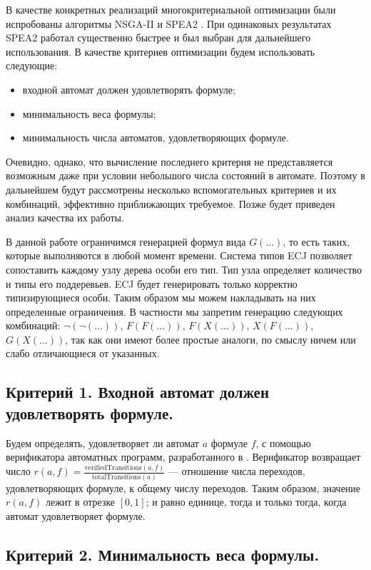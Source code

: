 \documentclass[12pt,fleqn]{article}
\begin{document}
В качестве конкретных реализаций многокритериальной оптимизации были испробованы алгоритмы NSGA-II \cite{nsga2} и SPEA2 \cite{spea2}.
При одинаковых результатах SPEA2 работал существенно быстрее и был выбран для дальнейшего использования.
В качестве критериев оптимизации будем использовать следующие:
\begin{itemize}
\item входной автомат должен удовлетворять формуле;
\item минимальность веса формулы;
\item минимальность числа автоматов, удовлетворяющих формуле.
\end{itemize}
Очевидно, однако, что вычисление последнего
критерия не представляется возможным даже при условии небольшого числа состояний в автомате. Поэтому в дальнейшем будут
рассмотрены несколько вспомогательных критериев и их комбинаций, эффективно приближающих требуемое. Позже будет приведен
анализ качества их работы.

В данной работе ограничимся генерацией формул вида $G(\ldots)$, то есть таких, которые выполняются в любой момент времени.
Система типов ECJ позволяет сопоставить каждому узлу дерева особи его тип. Тип узла
определяет количество и типы его поддеревьев. ECJ будет генерировать только корректно типизирующиеся особи.
Таким образом мы можем накладывать на них определенные ограничения. В частности мы запретим генерацию следующих
комбинаций: $\lnot(\lnot(\ldots))$, $F(F(\ldots))$, $F(X(\ldots))$, $X(F(\ldots))$, $G(X(\ldots))$, так как
они имеют более простые аналоги, по смыслу ничем или слабо отличающиеся от указанных.

\subsection{Критерий 1. Входной автомат должен удовлетворять формуле.}

Будем определять, удовлетворяет ли автомат $a$ формуле $f$, с помощью верификатора автоматных программ, разработанного в \cite{eg}.
Верификатор возвращает число $r(a, f) = \frac{\text{verifiedTransitions}(a, f)}{\text{totalTransitions}(a)}$ --- отношение числа
переходов, удовлетворяющих формуле, к общему числу переходов. Таким образом, значение $r(a, f)$ лежит в отрезке $[0, 1]$; и равно
единице, тогда и только тогда, когда автомат удовлетворяет формуле.

\subsection{Критерий 2. Минимальность веса формулы.}
\end{document}
